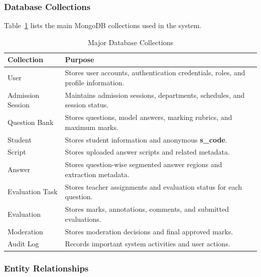 \subsubsection{Database Collections}

Table~\ref{tab:database_collections} lists the main MongoDB collections used in the system.

\begin{table}[H]
\centering
\caption{Major Database Collections}
\label{tab:database_collections}
\renewcommand{\arraystretch}{1.3}
\begin{tabular}{|p{5cm}|p{9cm}|}
\hline
\textbf{Collection} & \textbf{Purpose} \\
\hline

User &
Stores user accounts, authentication credentials, roles, and profile information. \\
\hline

Admission Session &
Maintains admission sessions, departments, schedules, and session status. \\
\hline

Question Bank &
Stores questions, model answers, marking rubrics, and maximum marks. \\
\hline

Student &
Stores student information and anonymous \textbf{s\_code}. \\
\hline

Script &
Stores uploaded answer scripts and related metadata. \\
\hline

Answer &
Stores question-wise segmented answer regions and extraction metadata. \\
\hline

Evaluation Task &
Stores teacher assignments and evaluation status for each question. \\
\hline

Evaluation &
Stores marks, annotations, comments, and submitted evaluations. \\
\hline

Moderation &
Stores moderation decisions and final approved marks. \\
\hline

Audit Log &
Records important system activities and user actions. \\
\hline

\end{tabular}
\end{table}

\subsubsection{Entity Relationships}

